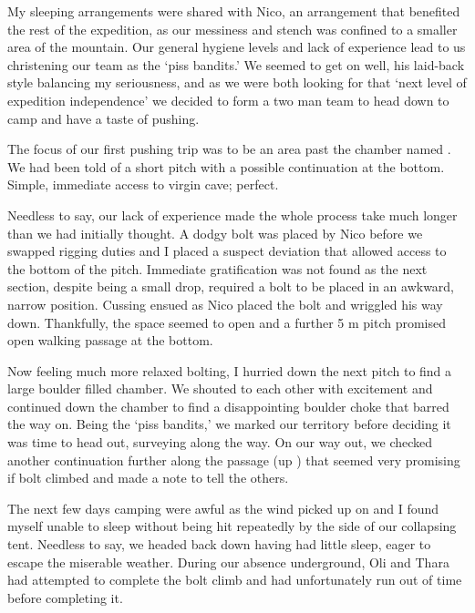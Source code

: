 My sleeping arrangements were shared with Nico, an arrangement that
benefited the rest of the expedition, as our messiness and stench was
confined to a smaller area of the mountain. Our general hygiene levels
and lack of experience lead to us christening our team as the `piss
bandits.' We seemed to get on well, his laid-back style balancing my
seriousness, and as we were both looking for that `next level of
expedition independence' we decided to form a two man team to head down
to camp and have a taste of pushing.

The focus of our first pushing trip was to be an area past the 
chamber named . We had been told of a short pitch with a
possible continuation at the bottom. Simple, immediate access to virgin
cave; perfect.

Needless to say, our lack of experience made the whole process take much
longer than we had initially thought. A dodgy bolt was placed by Nico
before we swapped rigging duties and I placed a suspect deviation that
allowed access to the bottom of the pitch. Immediate gratification was
not found as the next section, despite being a small drop, required a
bolt to be placed in an awkward, narrow position. Cussing ensued as Nico
placed the bolt and wriggled his way down. Thankfully, the space seemed
to open and a further 5 m pitch promised open walking passage at the
bottom.


Now feeling much more relaxed bolting, I hurried down the next pitch to
find a large boulder filled chamber. We shouted to each other with
excitement and continued down the chamber to find a disappointing
boulder choke that barred the way on. Being the `piss bandits,' we
marked our territory before deciding it was time to head out, surveying
along the way. On our way out, we checked another continuation further
along the  passage (up ) that seemed very promising
if bolt climbed and made a note to tell the others.


The next few days camping were awful as the wind picked up on 
and I found myself unable to sleep without being hit repeatedly by the
side of our collapsing tent. Needless to say, we headed back down having
had little sleep, eager to escape the miserable weather. During our
absence underground, Oli and Thara had attempted to complete the bolt
climb and had unfortunately run out of time before completing it.



